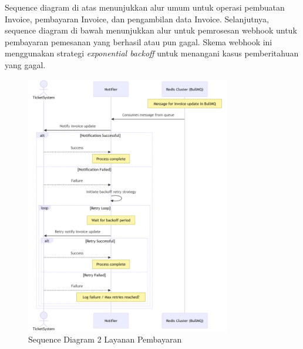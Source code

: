Sequence diagram di atas menunjukkan alur umum untuk operasi pembuatan Invoice, pembayaran Invoice, dan pengambilan data Invoice. Selanjutnya, sequence diagram di bawah menunjukkan alur untuk pemrosesan webhook untuk pembayaran pemesanan yang berhasil atau pun gagal. Skema webhook ini menggunakan strategi \textit{exponential backoff} untuk menangani kasus pemberitahuan yang gagal.

\pagebreak

\begin{figure}[htbp]
    \centering
    \includegraphics[width=0.8\textwidth]{resources/chapter-3/payment-flow2.png}
    \caption{Sequence Diagram 2 Layanan Pembayaran}
    \label{fig:payment-flow2}
\end{figure}